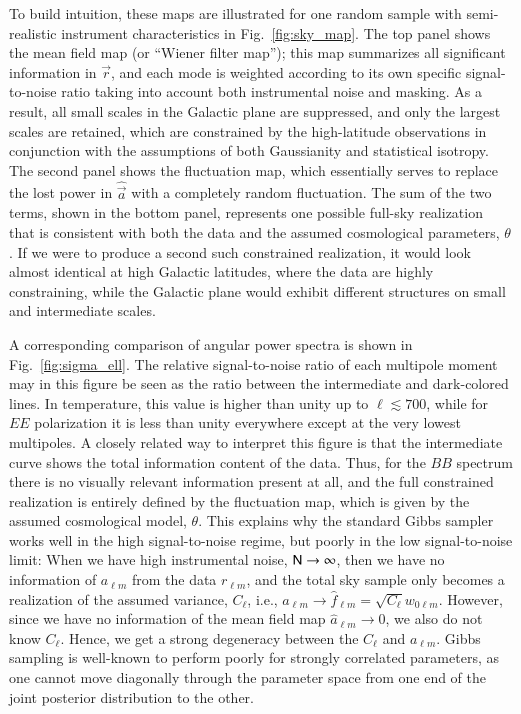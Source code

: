 \documentclass[twocolumn]{aa}
\renewcommand{\a}[0]{\vec{a}}
\newcommand{\N}[0]{\tens{N}}
\renewcommand{\r}[0]{\vec{r}}
\begin{document}
To build intuition, these maps are illustrated for one random sample with semi-realistic instrument characteristics in Fig.~\ref{fig:sky_map}. The top panel shows the mean field map (or ``Wiener filter map''); this map summarizes all significant information in $\r$, and each mode is weighted according to its own specific signal-to-noise ratio taking into account both instrumental noise and masking. As a result, all small scales in the Galactic plane are suppressed, and only the largest scales are retained, which are constrained by the high-latitude observations in conjunction with the assumptions of both Gaussianity and statistical isotropy. The second panel shows the fluctuation map, which essentially serves to replace the lost power in $\hat{\a}$ with a completely random fluctuation. The sum of the two terms, shown in the bottom panel, represents one possible full-sky realization that is consistent with both the data and the assumed cosmological parameters, $\theta$. If we were to produce a second such constrained realization, it would look almost identical at high Galactic latitudes, where the data are highly constraining, while the Galactic plane would exhibit different structures on small and intermediate scales.

A corresponding comparison of angular power spectra is shown in Fig.~\ref{fig:sigma_ell}. The relative signal-to-noise ratio of each multipole moment may in this figure be seen as the ratio between the intermediate and dark-colored lines. In temperature, this value is higher than unity up to $\ell\lesssim700$, while for $EE$ polarization it is less than unity everywhere except at the very lowest multipoles. A closely related way to interpret this figure is that the intermediate curve shows the total information content of the data. Thus, for the $BB$ spectrum there is no visually relevant information present at all, and the full constrained realization is entirely defined by the fluctuation map, which is given by the assumed cosmological model, $\theta$. This explains why the standard Gibbs sampler works well in the high signal-to-noise regime, but poorly in the low signal-to-noise limit: When we have high instrumental noise, $\N \rightarrow \infty$, then we have no information of $a_{\ell m}$ from the data $r_{\ell m}$, and the total sky sample only becomes a realization of the assumed variance, $C_{\ell}$, i.e., $a_{\ell m} \rightarrow \hat{f}_{\ell m} = \sqrt{C_{\ell}} w_{0\ell m}$. However, since we have no information of the mean field map $\hat{a}_{\ell m} \rightarrow 0$, we also do not know $C_\ell$. Hence, we get a strong degeneracy between the $C_\ell$ and $a_{\ell m}$. Gibbs sampling is well-known to perform poorly for strongly correlated parameters, as one cannot move diagonally through the parameter space from one end of the joint posterior distribution to the other. 
\end{document}
